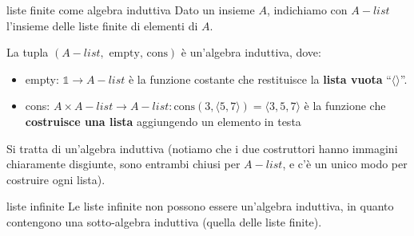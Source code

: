 \documentclass[a4paper,11pt]{report}
\begin{document}
\begin{gframe}{liste finite come algebra induttiva}
    \label{alist}
    Dato un insieme \( A \), indichiamo con \( A-list \) l'insieme delle liste finite di elementi di \( A \).

    La tupla \( (A-list,\text{ empty, cons}) \) è un'algebra induttiva, dove:
    \begin{itemize}
        \item empty: \( \mathbb{1} \to A-list \) è la funzione costante che restituisce la \textbf{lista vuota} ``\(\langle \rangle\)''.
        \item cons: \( A \times A-list \to A-list : \text{cons}(3, \langle 5, 7 \rangle) = \langle 3, 5, 7 \rangle \) è la funzione che \textbf{costruisce una lista} aggiungendo un elemento in testa
    \end{itemize}

    Si tratta di un'algebra induttiva (notiamo che i due costruttori hanno immagini chiaramente disgiunte, sono entrambi chiusi per \( A-list \), e c'è un unico modo per costruire ogni lista).

    \begin{gframe}[colframe=Mahogany, colbacktitle=Mahogany]{liste infinite}
        Le liste infinite non possono essere un'algebra induttiva, in quanto contengono una sotto-algebra induttiva (quella delle liste finite).
    \end{gframe}
\end{gframe}
\end{document}
